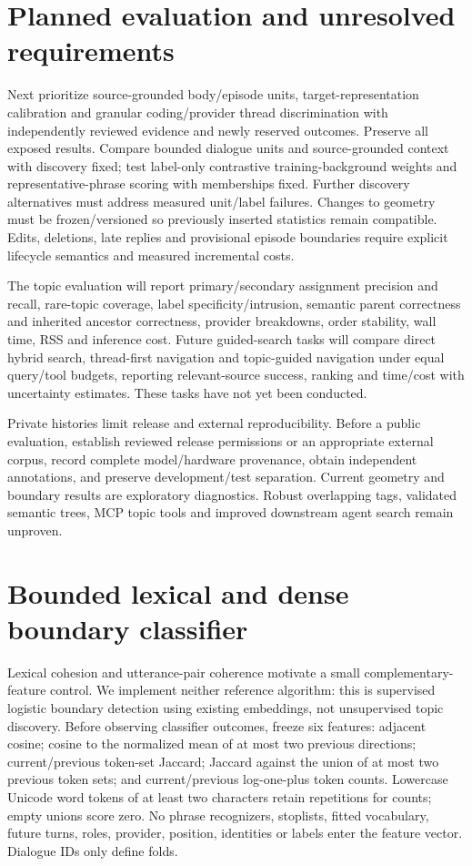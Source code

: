 \documentclass[11pt]{article}
\begin{document}
\section{Planned evaluation and unresolved requirements}
Next prioritize source-grounded body/episode units, target-representation
calibration and granular coding/provider thread discrimination with independently
reviewed evidence and newly reserved outcomes. Preserve all exposed results. Compare
bounded dialogue units and source-grounded context with
discovery fixed; test label-only contrastive training-background weights and
representative-phrase scoring with memberships fixed. Further discovery alternatives
must address measured unit/label failures. Changes to geometry
must be frozen/versioned so previously inserted statistics remain compatible.
Edits, deletions, late replies and provisional episode boundaries require explicit
lifecycle semantics and measured incremental costs.

The topic evaluation will report primary/secondary assignment precision and
recall, rare-topic coverage, label specificity/intrusion, semantic parent
correctness and inherited ancestor correctness, provider breakdowns, order
stability, wall time, RSS and inference cost. Future guided-search tasks will
compare direct hybrid search, thread-first navigation and topic-guided navigation
under equal query/tool budgets, reporting relevant-source success, ranking and
time/cost with uncertainty estimates. These tasks have not yet been conducted.

Private histories limit release and external reproducibility. Before a public
evaluation, establish reviewed release permissions or an appropriate external
corpus, record complete model/hardware provenance, obtain independent annotations,
and preserve development/test separation. Current geometry and boundary results
are exploratory diagnostics. Robust overlapping tags, validated semantic trees,
MCP topic tools and improved downstream agent search remain unproven.

\section{Bounded lexical and dense boundary classifier}
\label{sec:tiage-classifier}
Lexical cohesion \cite{texttiling} and utterance-pair coherence \cite{xing}
motivate a small complementary-feature control. We implement neither reference
algorithm: this is supervised logistic boundary detection using existing
embeddings, not unsupervised topic discovery. Before observing classifier
outcomes, freeze six features: adjacent cosine; cosine to the normalized mean of
at most two previous directions; current/previous token-set Jaccard; Jaccard
against the union of at most two previous token sets; and current/previous
log-one-plus token counts. Lowercase Unicode word tokens of at least two
characters retain repetitions for counts; empty unions score zero. No phrase
recognizers, stoplists, fitted vocabulary, future turns, roles, provider, position,
identities or labels enter the feature vector. Dialogue IDs only define folds.
\end{document}
